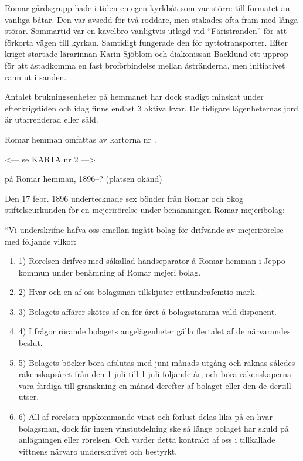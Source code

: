 
Romar gårdsgrupp hade i tiden en egen kyrkbåt som var större till formatet än vanliga båtar. Den var avsedd för två roddare, men stakades ofta fram med långa störar. Sommartid var en kavelbro vanligtvis utlagd vid ``Färistranden'' för att förkorta vägen till kyrkan. Samtidigt fungerade den för nyttotransporter. Efter kriget startade lärarinnan Karin Sjöblom och diakonissan Backlund ett upprop för att åstadkomma en fast broförbindelse mellan åstränderna, men initiativet rann ut i sanden.

Antalet brukningsenheter på hemmanet har dock stadigt minskat under efterkrigstiden och idag finns endast 3 aktiva kvar. De tidigare lägenheternas jord är utarrenderad eller såld.



Romar hemman omfattas av kartorna nr .


<--- se KARTA nr 2 --->


 på Romar hemman, 1896--? (platsen okänd)

Den 17 febr. 1896 undertecknade sex bönder från Romar och Skog stiftelseurkunden för en mejerirörelse under benämningen Romar mejeribolag:

``Vi underskrifne hafva oss emellan ingått bolag för drifvande av mejerirörelse med följande vilkor:
\begin{enumerate}
  \item 1) Rörelsen drifves med såkallad handseparator å Romar hemman i Jeppo kommun under benämning af Romar mejeri bolag.
  \item 2) Hvar och en af oss bolagsmän tillskjuter etthundrafemtio mark.
  \item 3) Bolagets affärer skötes af en för året å bolagsstämma vald disponent.
  \item 4) I frågor rörande bolagets angelägenheter gälla flertalet af de närvarandes beslut.
  \item 5) Bolagets böcker böra afslutas med juni månads utgång och räknas således räkenskapsåret från den 1 juli till 1 juli följande år, och böra räkenskaperna vara färdiga till granskning en månad derefter af bolaget eller den de dertill utser.
  \item 6) All af rörelsen uppkommande vinst och förlust delas lika på en hvar bolagsman, dock får ingen vinstutdelning ske så länge bolaget har skuld på anlägningen eller rörelsen. Och varder detta kontrakt af oss i tillkallade vittnens närvaro underskrifvet och bestyrkt.
\end{enumerate}

